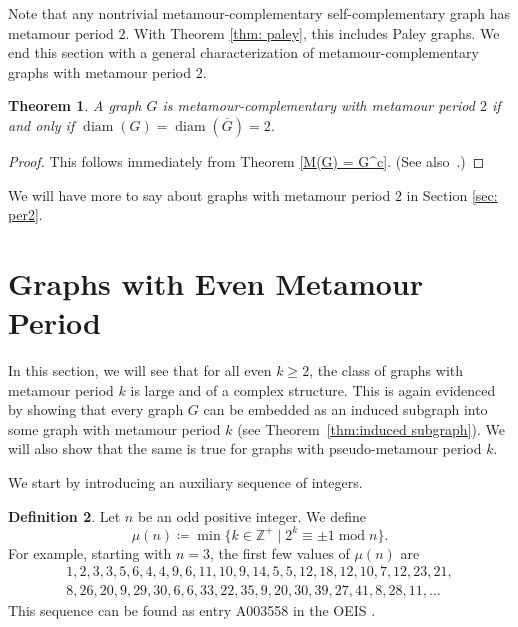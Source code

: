 \documentclass[12pt]{amsart}
\newtheorem{theorem}{Theorem}[section]
\theoremstyle{definition}
\newtheorem{definition}[theorem]{Definition}
\theoremstyle{remark}
\numberwithin{equation}{section}
\numberwithin{figure}{section}
\renewcommand{\mod}{\operatorname{mod}}
\newcommand{\diam}{\operatorname{diam}}
\newcommand{\Z}{\mathbb{Z}}
\begin{document}
Note that any nontrivial metamour-complementary self-comple\-men\-tary graph has metamour period $2$. With Theorem \ref{thm: paley}, this includes Paley graphs.
We end this section with a general characterization of metamour-complementary graphs with metamour period $2$.

\begin{theorem} \label{thm: metcomplchar}
    A graph $G$ is metamour-complementary with metamour period $2$ if and only if $\diam(G) = \diam(\overline{G}) = 2$.
\end{theorem}

\begin{proof}

    This follows immediately from Theorem \ref{M(G) = G^c}.
    (See also~\cite[Prop.~1]{Zelinka}.)
\end{proof}

We will have more to say about graphs with metamour period $2$ in Section \ref{sec: per2}.

\section{Graphs with Even Metamour Period} 

In this section, we will see that for all even $k\ge 2$, the class of graphs with metamour period $k$ is large and of a complex structure. This is again evidenced by showing that every graph $G$ can be embedded as an induced subgraph into some graph with metamour period $k$ (see Theorem~\ref{thm:induced subgraph}). We will also show that the same is true for graphs with pseudo-metamour period $k$.

We start by introducing an auxiliary sequence of integers.

\begin{definition}
    Let $n$ be an odd positive integer.
    We define 
    \[ \mu(n) \coloneqq \min\{k\in\Z^+ \mid 2^k\equiv\pm1\mod{n}\}. \]
    For example, starting with $n=3$, the first few values of $\mu(n)$ are 
\begin{align*}
1, 2, 3, 3, 5, 6, 4, 4, 9, 6, 11, 10, 9, 14, 5, 5, 12, 18, 12, 10, 7, 12, 23, 21,\\
8, 26, 20, 9, 29, 30, 6, 6, 33, 22, 35, 9, 20, 30, 39, 27, 41, 8, 28, 11, \ldots\
\end{align*}
This sequence can be found as entry A003558 in the OEIS \cite{OEIS}.
\end{definition}
\end{document}
